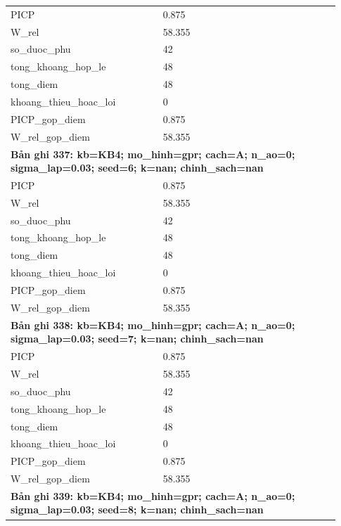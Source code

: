 \begin{longtable}{p{0.43\linewidth}p{0.50\linewidth}}
PICP & 0.875 \\
W\_\allowbreak rel & 58.355 \\
so\_\allowbreak duoc\_\allowbreak phu & 42 \\
tong\_\allowbreak khoang\_\allowbreak hop\_\allowbreak le & 48 \\
tong\_\allowbreak diem & 48 \\
khoang\_\allowbreak thieu\_\allowbreak hoac\_\allowbreak loi & 0 \\
PICP\_\allowbreak gop\_\allowbreak diem & 0.875 \\
W\_\allowbreak rel\_\allowbreak gop\_\allowbreak diem & 58.355 \\
\midrule
\multicolumn{2}{p{0.95\linewidth}}{\textbf{Bản ghi 337: kb=KB4; mo\_hinh=gpr; cach=A; n\_ao=0; sigma\_lap=0.03; seed=6; k=nan; chinh\_sach=nan}} \\
PICP & 0.875 \\
W\_\allowbreak rel & 58.355 \\
so\_\allowbreak duoc\_\allowbreak phu & 42 \\
tong\_\allowbreak khoang\_\allowbreak hop\_\allowbreak le & 48 \\
tong\_\allowbreak diem & 48 \\
khoang\_\allowbreak thieu\_\allowbreak hoac\_\allowbreak loi & 0 \\
PICP\_\allowbreak gop\_\allowbreak diem & 0.875 \\
W\_\allowbreak rel\_\allowbreak gop\_\allowbreak diem & 58.355 \\
\midrule
\multicolumn{2}{p{0.95\linewidth}}{\textbf{Bản ghi 338: kb=KB4; mo\_hinh=gpr; cach=A; n\_ao=0; sigma\_lap=0.03; seed=7; k=nan; chinh\_sach=nan}} \\
PICP & 0.875 \\
W\_\allowbreak rel & 58.355 \\
so\_\allowbreak duoc\_\allowbreak phu & 42 \\
tong\_\allowbreak khoang\_\allowbreak hop\_\allowbreak le & 48 \\
tong\_\allowbreak diem & 48 \\
khoang\_\allowbreak thieu\_\allowbreak hoac\_\allowbreak loi & 0 \\
PICP\_\allowbreak gop\_\allowbreak diem & 0.875 \\
W\_\allowbreak rel\_\allowbreak gop\_\allowbreak diem & 58.355 \\
\midrule
\multicolumn{2}{p{0.95\linewidth}}{\textbf{Bản ghi 339: kb=KB4; mo\_hinh=gpr; cach=A; n\_ao=0; sigma\_lap=0.03; seed=8; k=nan; chinh\_sach=nan}} \\

\end{longtable}
